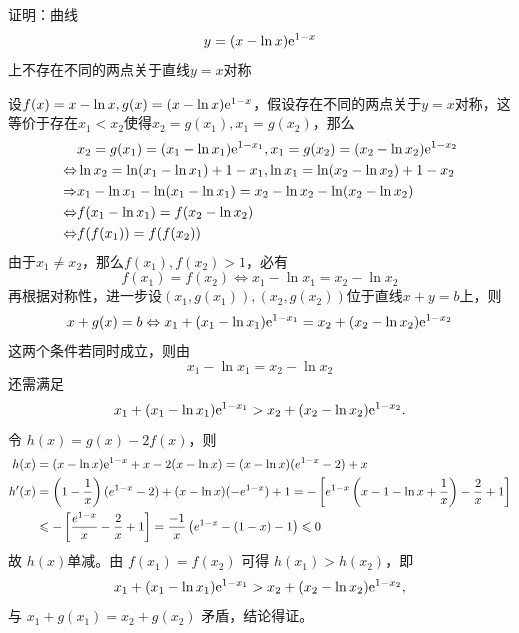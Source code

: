 \newpage
\begin{example}[对称曲线比较]
    证明：曲线\[y=(x-\ln x)\mathrm{e}^{1-x}\]上不存在不同的两点关于直线$y=x$对称
\end{example}
\begin{solution}
设$f(x)=x-\ln x,g(x)=(x-\ln x)\mathrm{e}^{1-x}$，假设存在不同的两点关于$y=x$对称，这等价于存在$x_1< x_2$使得$x_2=g(x_1),x_1=g(x_2)$，那么
\begin{align*}
    &x_2=g(x_1)=(x_1-\ln x_1)\mathrm{e}^{1-x_1},x_1=g(x_2)=(x_2-\ln x_2)\mathrm{e}^{1-x_2}\\
\Leftrightarrow& \ln x_2=\ln(x_1-\ln x_1)+1-x_1, \ln x_1=\ln(x_2-\ln x_2)+1-x_2\\
\Rightarrow &x_1-\ln x_1-\ln(x_1-\ln x_1)=x_2-\ln x_2-\ln(x_2-\ln x_2)\\
\Leftrightarrow& f(x_1-\ln x_1)=f(x_2-\ln x_2)\\
\Leftrightarrow& f(f(x_1))=f(f(x_2))
\end{align*}
由于$x_1\neq x_2$，那么$f(x_1),f(x_2)>1$，必有
\[f(x_1)=f(x_2)\Leftrightarrow x_1-\ln x_1=x_2-\ln x_2\]
再根据对称性，进一步设$(x_1,g(x_1)),(x_2,g(x_2))$位于直线$x+y=b$上，则
\[x+g(x)=b\Leftrightarrow x_1+(x_1-\ln x_1)\mathrm{e}^{1-x_1}=x_2+(x_2-\ln x_2)\mathrm{e}^{1-x_2}\]
这两个条件若同时成立，则由
\[
x_1-\ln x_1=x_2-\ln x_2
\]
还需满足
\[
x_1+(x_1-\ln x_1)\mathrm{e}^{1-x_1}>x_2+(x_2-\ln x_2)\mathrm{e}^{1-x_2}.
\]
令 $h(x)=g(x)-2f(x)$，则
\begin{align*}
h(x)&=(x-\ln x)\mathrm{e}^{1-x}+x-2(x-\ln x)=(x-\ln x)(e^{1-x}-2)+x\\
h'(x)&=\left(1-\frac1x\right)(e^{1-x}-2)+(x-\ln x)(-e^{1-x})+1=-\left[e^{1-x}\left(x-1-\ln x+\frac1x\right)-\frac2x+1\right]\\
&\leqslant -\left[\frac{e^{1-x}}{x}-\frac2x+1\right]=\frac{-1}{x}\left(e^{1-x}-(1-x)-1\right)\leqslant 0
\end{align*}
故 $h(x)$单减。由 $f(x_1)=f(x_2)$ 可得 $h(x_1)>h(x_2)$，即
\[
x_1+(x_1-\ln x_1)\mathrm{e}^{1-x_1}>x_2+(x_2-\ln x_2)\mathrm{e}^{1-x_2},
\]
与 $x_1+g(x_1)=x_2+g(x_2)$ 矛盾，结论得证。
\end{solution}
\newpage


